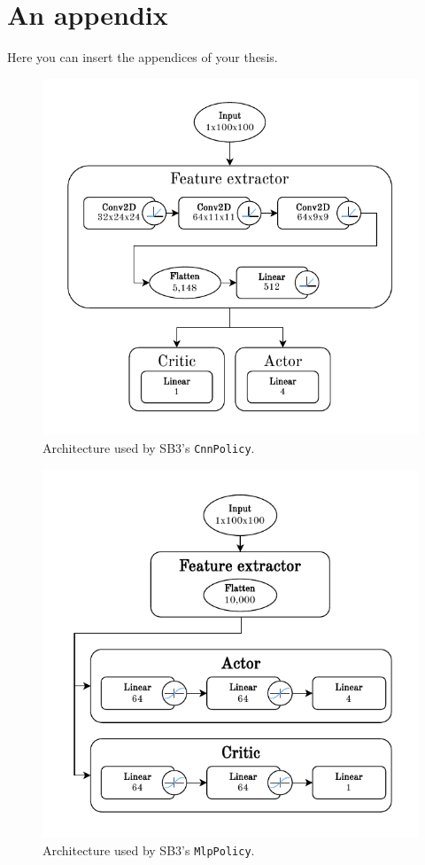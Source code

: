 \documentclass[
  digital,     %
  oneside,     %
  nosansbold,  %
  nocolorbold, %
  lof,         %
  lot,         %
]{fithesis4}
\begin{document}
\appendix %
\chapter{An appendix}
Here you can insert the appendices of your thesis.

\begin{figure}
    \includegraphics[width=1\linewidth]{diagrams/cnn_arch.pdf}
    \caption{Architecture used by SB3's \texttt{CnnPolicy}.}
    \label{fig:cnn_policy}
\end{figure}

\begin{figure}
    \includegraphics[width=1\linewidth]{diagrams/mlp_arch.pdf}
    \caption{Architecture used by SB3's \texttt{MlpPolicy}.}
    \label{fig:mlp_policy}
\end{figure}
\end{document}
